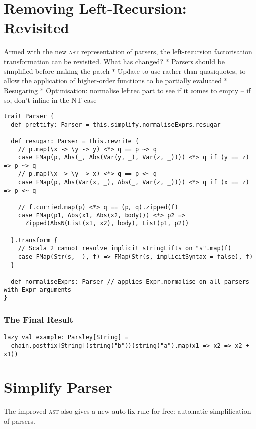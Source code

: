 \documentclass[../../main.tex]{subfiles}
\begin{document}

\section{Removing Left-Recursion: Revisited}
Armed with the new \textsc{ast} representation of parsers, the left-recursion factorisation transformation can be revisited.
What has changed?
* Parsers should be simplified before making the patch
* Update to use  rather than quasiquotes, to allow the application of higher-order functions to be partially evaluated
* Resugaring
* Optimisation: normalise leftrec part to see if it comes to empty -- if so, don't inline in the NT case

\begin{verbatim}
trait Parser {
  def prettify: Parser = this.simplify.normaliseExprs.resugar

  def resugar: Parser = this.rewrite {
    // p.map(\x -> \y -> y) <*> q == p ~> q
    case FMap(p, Abs(_, Abs(Var(y, _), Var(z, _)))) <*> q if (y == z) => p ~> q
    // p.map(\x -> \y -> x) <*> q == p <~ q
    case FMap(p, Abs(Var(x, _), Abs(_, Var(z, _)))) <*> q if (x == z) => p <~ q

    // f.curried.map(p) <*> q == (p, q).zipped(f)
    case FMap(p1, Abs(x1, Abs(x2, body))) <*> p2 =>
      Zipped(AbsN(List(x1, x2), body), List(p1, p2))

  }.transform {
    // Scala 2 cannot resolve implicit stringLifts on "s".map(f)
    case FMap(Str(s, _), f) => FMap(Str(s, implicitSyntax = false), f)
  }

  def normaliseExprs: Parser // applies Expr.normalise on all parsers with Expr arguments
}
\end{verbatim}


\subsubsection{The Final Result}
\begin{verbatim}
lazy val example: Parsley[String] =
  chain.postfix[String](string("b"))(string("a").map(x1 => x2 => x2 + x1))
\end{verbatim}

\section{Simplify Parser}
The improved  \textsc{ast} also gives a new auto-fix rule for free: automatic simplification of parsers.
\end{document}
